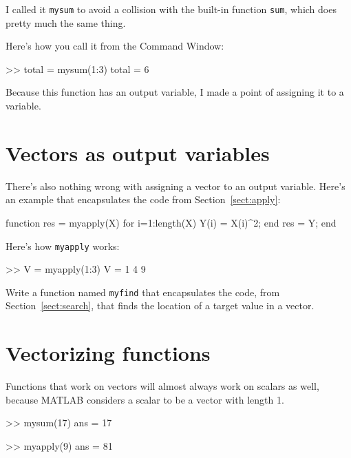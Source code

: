 \documentclass[
]{book}
\numberwithin{Answer}{chapter}
\numberwithin{Exercise}{chapter}
\begin{document}
I called it {\tt mysum} to avoid a collision with the built-in
function {\tt sum}, which does pretty much the same thing.


Here's how you call it from the {\sf Command Window}:

\begin{code}
>> total = mysum(1:3)
total = 6
\end{code}

Because this function has an output variable, I made a
point of assigning it to a variable.



\section{Vectors as output variables}

There's also nothing wrong with assigning a vector to an output
variable.  Here's an example that encapsulates the code from
Section~\ref{sect:apply}:

\begin{code}
function res = myapply(X)
    for i=1:length(X)
        Y(i) = X(i)^2;
    end
    res = Y;
end
\end{code}

Here's how {\tt myapply} works:

\begin{code}
>> V = myapply(1:3)
V = 1     4     9
\end{code}

\begin{ex}
Write a function named {\tt myfind} that
encapsulates the code, from Section~\ref{sect:search}, that finds the
location of a target value in a vector.
\end{ex}



\section{Vectorizing functions}

Functions that work on vectors will almost always work on scalars
as well, because MATLAB considers a scalar to be a vector with
length 1.


\begin{code}
>> mysum(17)
ans = 17

>> myapply(9)
ans = 81
\end{code}
\end{document}
